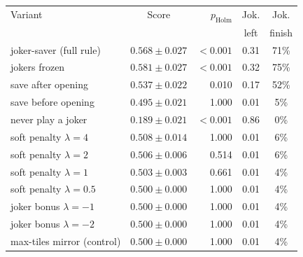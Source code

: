 \begin{tabular}{@{}lcrcc@{}}\toprule
Variant & Score & $p_{\text{Holm}}$ & Jok. & Jok.\\
 & & & left & finish\\\midrule
joker-saver (full rule) & $0.568\pm0.027$ & $<0.001$ & 0.31 & 71\%\\
\quad jokers frozen & $0.581\pm0.027$ & $<0.001$ & 0.32 & 75\%\\
\quad save after opening & $0.537\pm0.022$ & 0.010 & 0.17 & 52\%\\
\quad save before opening & $0.495\pm0.021$ & 1.000 & 0.01 & 5\%\\
\quad never play a joker & $0.189\pm0.021$ & $<0.001$ & 0.86 & 0\%\\
soft penalty $\lambda=4$ & $0.508\pm0.014$ & 1.000 & 0.01 & 6\%\\
soft penalty $\lambda=2$ & $0.506\pm0.006$ & 0.514 & 0.01 & 6\%\\
soft penalty $\lambda=1$ & $0.503\pm0.003$ & 0.661 & 0.01 & 4\%\\
soft penalty $\lambda=0.5$ & $0.500\pm0.000$ & 1.000 & 0.01 & 4\%\\
joker bonus $\lambda=-1$ & $0.500\pm0.000$ & 1.000 & 0.01 & 4\%\\
joker bonus $\lambda=-2$ & $0.500\pm0.000$ & 1.000 & 0.01 & 4\%\\
max-tiles mirror (control) & $0.500\pm0.000$ & 1.000 & 0.01 & 4\%\\
\bottomrule
\end{tabular}
